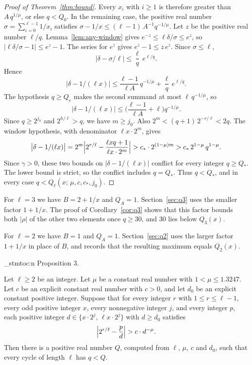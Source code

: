 \documentclass[11pt]{article}
\newenvironment{named}[1]{%
  \par\addvspace{\medskipamount}%
  \pagebreak[3]%
  \noindent{\bfseries #1}\space\ignorespaces
  \stmtoc{#1}%
}{\par\addvspace{\medskipamount}}
\newcommand{\stmtoc}[1]{ \qn_stmtoc:n {#1} }
\newcounter{lemmaref}
\newcommand{\marklemma}[2]{%
  \setcounter{lemmaref}{#1}%
  \addtocounter{lemmaref}{-1}%
  \refstepcounter{lemmaref}%
  \label{#2}%
}
\begin{document}
\begin{proof}[Proof of Theorem~\ref{thm:bound}]
Every $x_i$ with $i \ge 1$ is therefore greater than $A\, q^{1/\mu}$, or else $q < Q_0$.
In the remaining case, the positive real number $\sigma = \sum_{i=0}^{\ell-1} 1/x_i$ satisfies $\sigma - 1/x \le (\ell-1)\, A^{-1} q^{-1/\mu}$.
Let $z$ be the positive real number $\ell/q$.
Lemma~\ref{lem:any-window} gives $e^{-z} \le \ell\delta/\sigma \le e^{z}$, so $|\ell\delta/\sigma - 1| \le e^{z} - 1$.
The series for $e^{z}$ gives $e^{z} - 1 \le z\, e^{z}$.
Since $\sigma \le \ell$,
\[
\bigl|\delta - \sigma/\ell\bigr| \le \frac{\ell}{q}\, e^{\ell/q}.
\]
Hence
\[
\bigl|\delta - 1/(\ell x)\bigr| \le \frac{\ell-1}{\ell A}\, q^{-1/\mu} + \frac{\ell}{q}\, e^{\ell/q}.
\]
The hypothesis $q \ge Q_e$ makes the second summand at most $\ell\, q^{-1/\mu}$, so
\[
\bigl|\delta - 1/(\ell x)\bigr| \le \Biggl( \frac{\ell-1}{\ell A} + \ell \Biggr) q^{-1/\mu}.
\]
Since $q \ge 2^{j_0}$ and $2^{h/\ell} > q$, we have $m \ge j_0$.
Also $2^m < (q+1)\, 2^{-r/\ell} < 2q$.
The window hypothesis, with denominator $\ell x \cdot 2^m$, gives
\[
\bigl|\delta - 1/(\ell x)\bigr|
= 2^m \Bigl| 2^{r/\ell} - \frac{\ell x q + 1}{\ell x \cdot 2^m} \Bigr|
> c_* \cdot 2^{(1-\mu)m}
> c_*\, 2^{1-\mu}\, q^{1-\mu}.
\]
Since $\gamma > 0$, these two bounds on $|\delta - 1/(\ell x)|$ conflict for every integer $q \ge Q_*$.
The lower bound is strict, so the conflict includes $q = Q_*$.
Thus $q < Q_*$, and in every case $q < Q_\ell(x;\, \mu, c, c_*, j_0)$.
\end{proof}

For $\ell = 3$ we have $B = 2 + 1/x$ and $Q_A = 1$.
Section~\ref{sec:q3} uses the smaller factor $1+1/x$.
The proof of Corollary~\ref{cor:q3} shows that this factor bounds both $|\rho|$ of the other two elements once $q \ge 30$, and $30$ lies below $Q_3(x)$.

For $\ell = 2$ we have $B = 1$ and $Q_A = 1$.
Section~\ref{sec:q2} uses the larger factor $1+1/x$ in place of $B$, and records that the resulting maximum equals $Q_2(x)$.

\begin{named}{Proposition 3.}
\marklemma{3}{prop:exponent}
Let $\ell \ge 2$ be an integer.
Let $\mu$ be a constant real number with $1 < \mu \le 1.3247$.
Let $c$ be an explicit constant real number with $c > 0$, and let $d_0$ be an explicit constant positive integer.
Suppose that for every integer $r$ with $1 \le r \le \ell - 1$, every odd positive integer $x$, every nonnegative integer $j$, and every integer $p$, each positive integer $d \in \{x \cdot 2^j,\, \ell x \cdot 2^j\}$ with $d \ge d_0$ satisfies
\[
\Bigl| 2^{r/\ell} - \frac{p}{d} \Bigr| > c \cdot d^{-\mu}.
\]
Then there is a positive real number $Q$, computed from $\ell$, $\mu$, $c$ and $d_0$, such that every cycle of length $\ell$ has $q < Q$.
\end{named}
\end{document}
